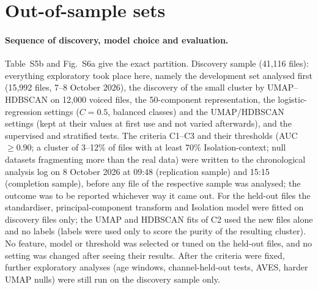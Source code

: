 \documentclass[11pt]{article}
\begin{document}
\section{Out-of-sample sets}
\paragraph{Sequence of discovery, model choice and evaluation.} Table~S5b and Fig.~S6a give the exact partition. Discovery sample (41,116 files): everything exploratory took place here, namely the development set analysed first (15,992 files, 7--8 October 2026), the discovery of the small cluster by UMAP--HDBSCAN on 12,000 voiced files, the 50-component representation, the logistic-regression settings ($C=0.5$, balanced classes) and the UMAP/HDBSCAN settings (kept at their values at first use and not varied afterwards), and the supervised and stratified tests. The criteria C1--C3 and their thresholds (AUC $\ge0.90$; a cluster of 3--12\% of files with at least 70\% Isolation-context; null datasets fragmenting more than the real data) were written to the chronological analysis log on 8 October 2026 at 09:48 (replication sample) and 15:15 (completion sample), before any file of the respective sample was analysed; the outcome was to be reported whichever way it came out. For the held-out files the standardiser, principal-component transform and Isolation model were fitted on discovery files only; the UMAP and HDBSCAN fits of C2 used the new files alone and no labels (labels were used only to score the purity of the resulting cluster). No feature, model or threshold was selected or tuned on the held-out files, and no setting was changed after seeing their results. After the criteria were fixed, further exploratory analyses (age windows, channel-held-out tests, AVES, harder UMAP nulls) were still run on the discovery sample only.
\end{document}

